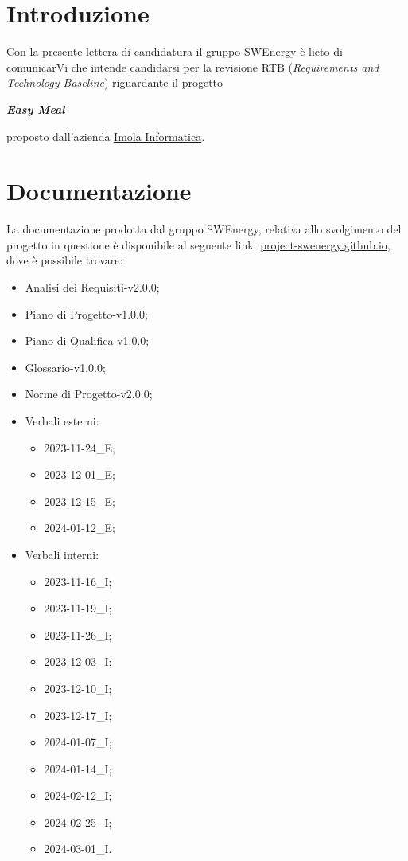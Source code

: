 \section{Introduzione}

Con la presente lettera di candidatura il gruppo SWEnergy è lieto di comunicarVi
che intende candidarsi per la revisione RTB (\textit{Requirements and Technology
	Baseline}) riguardante il progetto

\begin{center}
	\textbf{\textit{Easy Meal}}
\end{center}

\noindent
proposto dall'azienda \href{https://imolainformatica.it/}{Imola Informatica}.

\section{Documentazione}

La documentazione prodotta dal gruppo SWEnergy, relativa allo svolgimento del
progetto in questione è disponibile al seguente link:
\href{https://project-swenergy.github.io/}{project-swenergy.github.io},
dove è possibile trovare:
\begin{itemize}
	\item Analisi dei Requisiti-v2.0.0;
	\item Piano di Progetto-v1.0.0;
	\item Piano di Qualifica-v1.0.0;
	\item Glossario-v1.0.0;
	\item Norme di Progetto-v2.0.0;

	\item Verbali esterni:
	      \begin{itemize}
		      \item 2023-11-24_E;
		      \item 2023-12-01_E;
		      \item 2023-12-15_E;
		      \item 2024-01-12_E;
	      \end{itemize}

	\item Verbali interni:
	      \begin{itemize}
		      \item 2023-11-16_I;
		      \item 2023-11-19_I;
		      \item 2023-11-26_I;
		      \item 2023-12-03_I;
		      \item 2023-12-10_I;
		      \item 2023-12-17_I;
		      \item 2024-01-07_I;
		      \item 2024-01-14_I;
		      \item 2024-02-12_I;
		      \item 2024-02-25_I;
		      \item 2024-03-01_I.
	      \end{itemize}
\end{itemize}

